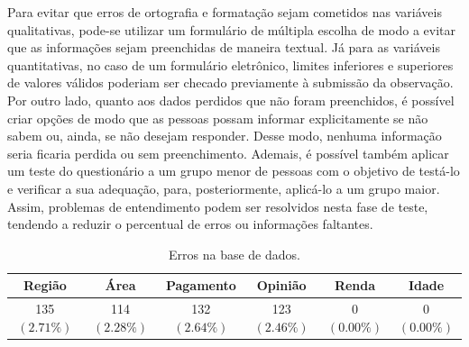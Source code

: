 \documentclass[10pt,a4paper,oneside]{article}
\begin{document}
Para evitar que erros de ortografia e formatação sejam cometidos nas variáveis qualitativas, pode-se utilizar um formulário de múltipla escolha de modo a evitar que as informações sejam preenchidas de maneira textual. Já para as variáveis quantitativas, no caso de um formulário eletrônico, limites inferiores e superiores de valores válidos poderiam ser checado previamente à submissão da observação. Por outro lado, quanto aos dados perdidos que não foram preenchidos, é possível criar opções de modo que as pessoas possam informar explicitamente se não sabem ou, ainda, se não desejam responder. Desse modo, nenhuma informação seria ficaria perdida ou sem preenchimento. Ademais, é possível também aplicar um teste do questionário a um grupo menor de pessoas com o objetivo de testá-lo e verificar a sua adequação, para, posteriormente, aplicá-lo a um grupo maior. Assim, problemas de entendimento podem ser resolvidos nesta fase de teste, tendendo a reduzir o percentual de erros ou informações faltantes.

\begin{table}[!h]
\centering
\caption{Erros na base de dados.}
\vspace{0.5em}
\label{table: dados errados}
\begin{tabular}{c c c c c c}
	\toprule
	\textbf{Região} & \textbf{Área}  & \textbf{Pagamento} & \textbf{Opinião} & \textbf{Renda} & \textbf{Idade} \\
	\midrule
	135 $(2.71\%)$  & 114 $(2.28\%)$ & 132 $(2.64\%)$     & 123 $(2.46\%)$   & 0 $(0.00\%)$   & 0 $(0.00\%)$ \\
	\bottomrule
\end{tabular}
\end{table}
\end{document}
